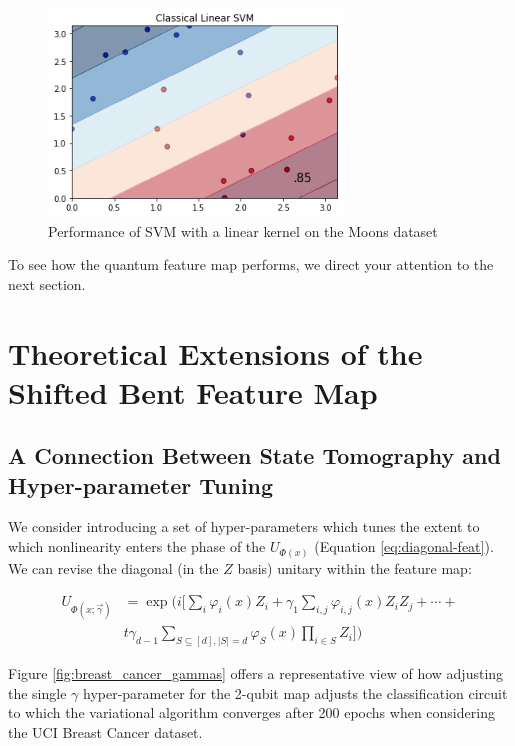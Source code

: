 \documentclass{beamer}
\newcommand\0{\mathbf{0}}
\newcommand\<{\langle}
\renewcommand\>{\rangle}
\renewcommand\phi{\varphi}
\begin{document}
\begin{frame}
\begin{figure}[H]
\centering
\includegraphics[width=0.7\textwidth]{images/moons_linear_svm}
\caption{Performance of SVM with a linear kernel on the Moons dataset}
\end{figure}

To see how the quantum feature map performs, we direct your attention to the next section.
\end{frame}

\section{Theoretical Extensions of the Shifted Bent Feature Map}

\subsection{A Connection Between State Tomography and Hyper-parameter Tuning}

\begin{frame}
We consider introducing a set of hyper-parameters which tunes the extent to which nonlinearity enters the phase of the $U_{\Phi(x)}$ (Equation \ref{eq:diagonal-feat}). We can revise the diagonal (in the $Z$ basis) unitary within the feature map:

\begin{align*}
U_{\Phi(x; \vec{\gamma})} &= \exp\Big(i \Big[\sum_{i} \phi_i(x) Z_i + \gamma_1 \sum_{i,j} \phi_{i,j}(x) Z_i Z_j + \cdots +  \\
&t\gamma_{d-1} \sum_{S \subseteq [d], |S| = d} \phi_S(x) \prod_{i \in S} Z_i \Big]\Big)	
\end{align*}

\end{frame}

\begin{frame}
Figure \ref{fig:breast_cancer_gammas} offers a representative view of how adjusting the single $\gamma$ hyper-parameter for the 2-qubit map adjusts the classification circuit to which the variational algorithm converges after 200 epochs when considering the UCI Breast Cancer dataset.
\end{frame}
\end{document}
